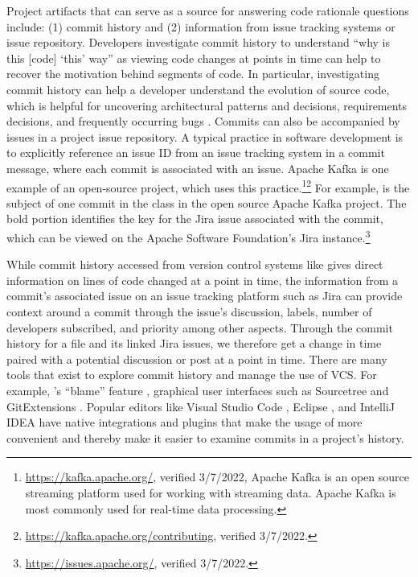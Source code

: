 Project artifacts that can serve as a source for answering code rationale questions include: (1) commit history and (2) information from issue tracking systems or issue repository. 
Developers investigate commit history to understand ``why is this [code] ‘this’ way'' as viewing code changes at points in time can help to recover the motivation behind segments of code.
In particular, investigating commit history can help a developer understand the evolution of source code, which is helpful for uncovering architectural patterns and decisions, requirements decisions, and frequently occurring bugs \cite{codoban_software_2015}.
Commits can also be accompanied by issues in a project issue repository. 
A typical practice in software development is to explicitly reference an issue ID from an issue tracking system in a commit message, where each commit is associated with an issue. Apache Kafka is one example of an open-source project, which uses this practice.\footnote{\url{https://kafka.apache.org/}, verified 3/7/2022, Apache Kafka is an open source streaming platform used for working with streaming data. Apache Kafka is most commonly used for real-time data processing.}\footnote{\url{https://kafka.apache.org/contributing}, verified 3/7/2022.}
For example, \colorbox{lightgray}{} is the subject of one commit in the  class in the open source Apache Kafka project. The bold portion identifies the key for the Jira issue associated with the commit, which can be viewed on the Apache Software Foundation's Jira instance.\footnote{\url{https://issues.apache.org/}, verified 3/7/2022.}

While commit history accessed from version control systems like  gives direct information on lines of code changed at a point in time, the information from a commit's associated issue on an issue tracking platform such as Jira \cite{jira} can provide context around a commit through the issue's discussion, labels, number of developers subscribed, and priority among other aspects.
Through the commit history for a file and its linked Jira issues, we therefore get a change in time paired with a potential discussion or post at a point in time.
There are many tools that exist to explore commit history and manage the use of VCS. For example, 's ``blame'' feature \cite{gitblame}, graphical user interfaces such as Sourcetree \cite{sourcetree} and GitExtensions \cite{gitextensions}. 
Popular editors like Visual Studio Code \cite{vscode}, Eclipse \cite{eclipse}, and IntelliJ IDEA \cite{intellij} have native  integrations and plugins that make the usage of  more convenient and thereby make it easier to examine commits in a project's history. 

